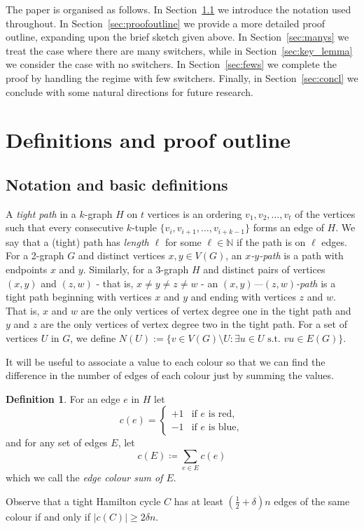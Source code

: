 \documentclass[A4paper,12pt]{article}
\theoremstyle{definition}
\newtheorem{define}[thm]{Definition}
\begin{document}
The paper is organised as follows. In Section~\ref{sec:Not} we introduce the notation used throughout. In Section~\ref{sec:proofoutline} we provide a more detailed proof outline, expanding upon the brief sketch given above. In Section~\ref{sec:manys} we treat the case where there are many switchers, while in Section~\ref{sec:key_lemma} we consider the case with no switchers. In Section~\ref{sec:fews} we complete the proof by handling the regime with few switchers. Finally, in Section~\ref{sec:concl} we conclude with some natural directions for future research.

\section{Definitions and proof outline}



\subsection{Notation and basic definitions}
\label{sec:Not}

A \emph{tight path} in a $k$-graph $H$ on $t$ vertices is an ordering 
$v_1, v_2, \ldots, v_t$ of the vertices such that every consecutive $k$-tuple $\{v_i, v_{i+1}, \ldots, v_{i+k-1}\}$
 forms an edge of $H$. We say that a (tight) path has \emph{length $\ell$} for some $\ell \in \mathbb{N}$ if the path is on $\ell$ edges. For a 2-graph $G$ and distinct vertices $x,y \in V(G)$, an \emph{$x$-$y$-path} is a path with endpoints $x$ and $y$. Similarly, for a $3$-graph $H$ and distinct pairs of vertices $(x,y)$ and $(z,w)$ - that is, $x \neq y \neq z \neq w$ - an \emph{$(x, y)$---$(z, w)$-path} is a tight path beginning with vertices $x$ and $y$ and ending with vertices $z$ and $w$. That is, $x$ and $w$ are the only vertices of vertex degree one in the tight path and $y$ and $z$ are the only vertices of vertex degree two in the tight path. For a set of vertices $U$ in $G$, we define $N(U) := \{v \in V(G)\setminus U: \exists u \in U \text{ s.t. } vu \in E(G)\}$.

It will be useful to associate a value to each colour so that we can find the difference in the number of edges of each colour just by summing the values.
\begin{define}
For an edge $e$ in $H$ let
\[
c(e) =
\begin{cases}
    +1 & \text{if $e$ is red}, \\
    -1 & \text{if $e$ is blue},
\end{cases}
\]
and for any set of edges $E$, let 
\[c(E) \coloneqq \sum_{e \in E} c(e)\]
which we call the \emph{edge colour sum of $E$}.
\end{define}
Observe that a  tight Hamilton cycle $C$ has at least $(\frac{1}{2} + \delta)n$ edges of the same colour if and only if $|c(C)| \geq 2\delta n$.
\end{document}
